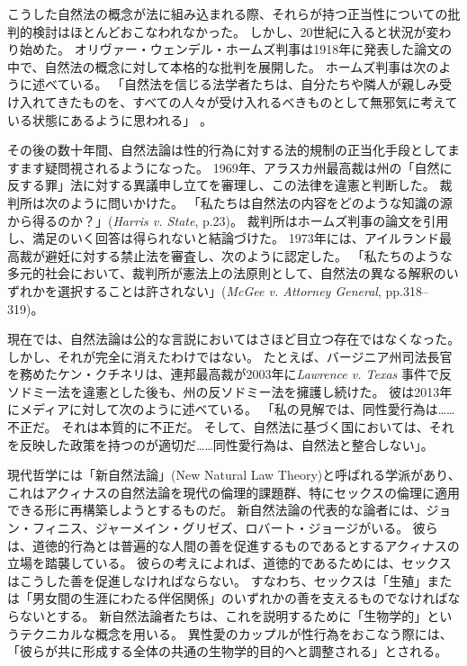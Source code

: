 \documentclass[paper=a4,book,openany]{jlreq} \usepackage{mystyle}
\begin{document}
こうした自然法の概念が法に組み込まれる際、それらが持つ正当性についての批判的検討はほとんどおこなわれなかった。
しかし、20世紀に入ると状況が変わり始めた。
オリヴァー・ウェンデル・ホームズ判事は1918年に発表した論文の中で、自然法の概念に対して本格的な批判を展開した。
ホームズ判事は次のように述べている。
「自然法を信じる法学者たちは、自分たちや隣人が親しみ受け入れてきたものを、すべての人々が受け入れるべきものとして無邪気に考えている状態にあるように思われる」\citep[p.40]{holmes18:_natur_law} 。

その後の数十年間、自然法論は性的行為に対する法的規制の正当化手段としてますます疑問視されるようになった。
1969年、アラスカ州最高裁は州の「自然に反する罪」法に対する異議申し立てを審理し、この法律を違憲と判断した。
裁判所は次のように問いかけた。
「私たちは自然法の内容をどのような知識の源から得るのか？」(\emph{Harris v. State},  p.23)。
裁判所はホームズ判事の論文を引用し、満足のいく回答は得られないと結論づけた。
1973年には、アイルランド最高裁が避妊に対する禁止法を審査し、次のように認定した。
「私たちのような多元的社会において、裁判所が憲法上の法原則として、自然法の異なる解釈のいずれかを選択することは許されない」(\emph{McGee v. Attorney General}, pp.318--319)。

現在では、自然法論は公的な言説においてはさほど目立つ存在ではなくなった。
しかし、それが完全に消えたわけではない。
たとえば、バージニア州司法長官を務めたケン・クチネリは、連邦最高裁が2003年に\emph{Lawrence v. Texas} 事件で反ソドミー法を違憲とした後も、州の反ソドミー法を擁護し続けた。
彼は2013年にメディアに対して次のように述べている。
「私の見解では、同性愛行為は……不正だ。
それは本質的に不正だ。
そして、自然法に基づく国においては、それを反映した政策を持つのが適切だ……同性愛行為は、自然法と整合しない」\citep{bump13:_virgin_is_retro}。

現代哲学には「新自然法論」(New Natural Law Theory)と呼ばれる学派があり、これはアクィナスの自然法論を現代の倫理的課題群、特にセックスの倫理に適用できる形に再構築しようとするものだ。
新自然法論の代表的な論者には、ジョン・フィニス、ジャーメイン・グリゼズ、ロバート・ジョージがいる。
彼らは、道徳的行為とは普遍的な人間の善を促進するものであるとするアクィナスの立場を踏襲している。
彼らの考えによれば、道徳的であるためには、セックスはこうした善を促進しなければならない。
すなわち、セックスは「生殖」または「男女間の生涯にわたる伴侶関係」のいずれかの善を支えるものでなければならないとする。
新自然法論者たちは、これを説明するために「生物学的」というテクニカルな概念を用いる。
異性愛のカップルが性行為をおこなう際には、「彼らが共に形成する全体の共通の生物学的目的へと調整される」とされる\citep[p.25]{girgis12:_what_marriag}。
\end{document}
